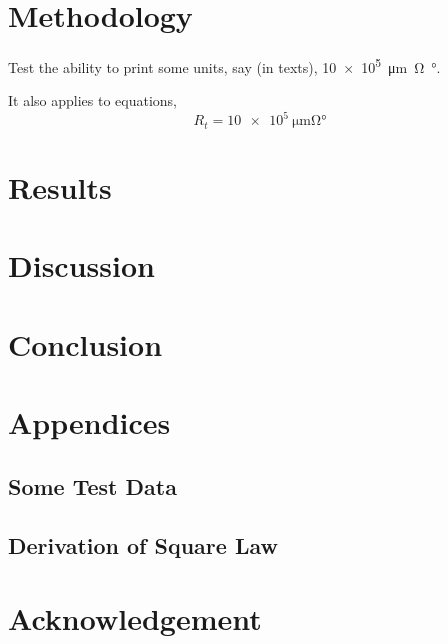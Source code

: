 \documentclass{zjui-report}
\begin{document}
\chapter{Methodology}

Test the ability to print some units, say (in texts), \SI{10e5}{\um\ohm\degree}.

It also applies to equations,
\begin{equation}
    R_{t}=\SI{10e5}{\um\ohm\degree}
\end{equation}
\chapter{Results}

\chapter{Discussion}

\chapter{Conclusion}


\printbibliography[title={References},heading=bibintoc]

\backmatter
\chapter{Appendices}
\renewcommand{\thesection}{\Alph{section}}
\section{Some Test Data}

\section{Derivation of Square Law}

\renewcommand{\thesection}{\arabic{chapter}.\arabic{section}}

\chapter{Acknowledgement}

\end{document}
